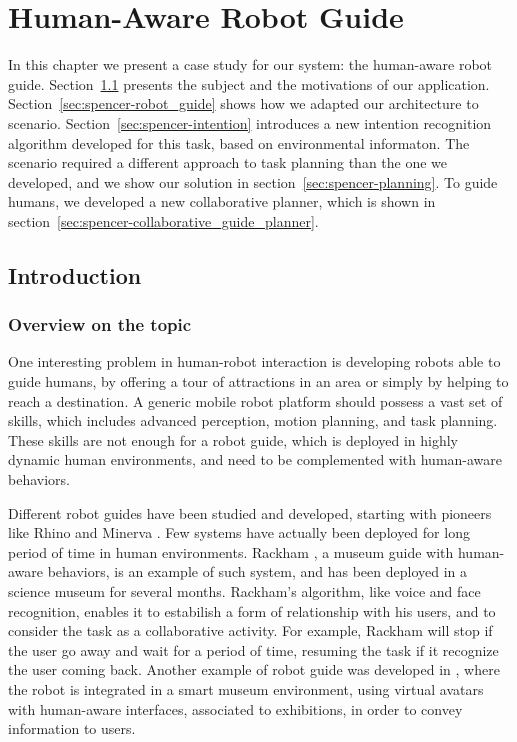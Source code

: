 
\chapter{Human-Aware Robot Guide} %

\label{chapter:case_study} %


 In this chapter we present a case study for our system: the human-aware robot guide. Section~\ref{sec:spencer-intro} presents the subject and the motivations of our application. Section~\ref{sec:spencer-robot_guide} shows how we adapted our architecture to scenario. Section~\ref{sec:spencer-intention} introduces a new intention recognition algorithm developed for this task, based on environmental informaton. The scenario required a different approach to task planning than the one we developed, and we show our solution in section~\ref{sec:spencer-planning}. To guide humans, we developed a new collaborative planner, which is shown in section~\ref{sec:spencer-collaborative_guide_planner}. 

\section{Introduction}
\label{sec:spencer-intro}
\subsection{Overview on the topic}
One interesting problem in human-robot interaction is developing robots able to guide humans, by offering a tour of attractions in an area or simply by helping to reach a destination.
A generic mobile robot platform should possess a vast set of skills, which includes advanced perception, motion planning, and task planning. These skills are not enough for a robot guide, which is deployed in highly dynamic human environments, and need to be complemented with human-aware behaviors.

Different robot guides have been studied and developed, starting with pioneers like Rhino and Minerva \citep{thrun2000probabilistic}.  Few systems have actually been deployed for long period of time in human environments. Rackham \citep{clodic2006rackham}, a museum guide with human-aware behaviors, is an example of such system, and has been deployed in a science museum for several months.  Rackham's algorithm, like voice and face recognition, enables it to estabilish a form of relationship with his users, and to consider the task as a collaborative activity. For example, Rackham will stop if the user go away and wait for a period of time, resuming the task if it recognize the user coming back.
 Another example of robot guide was developed in \cite{bueno2011autonomous}, where the robot is integrated  in a smart museum environment, using virtual avatars with human-aware interfaces, associated to exhibitions, in order to convey information to users. 


